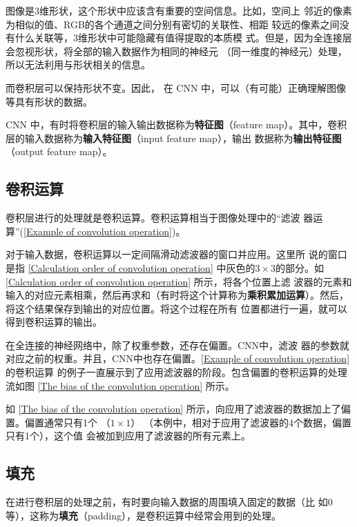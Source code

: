 \begin{tcolorbox}
    图像是3维形状，这个形状中应该含有重要的空间信息。比如，空间上
    邻近的像素为相似的值、RGB的各个通道之间分别有密切的关联性、相距
    较远的像素之间没有什么关联等，3维形状中可能隐藏有值得提取的本质模
    式。但是，因为全连接层会忽视形状，将全部的输入数据作为相同的神经元
    （同一维度的神经元）处理，所以无法利用与形状相关的信息。
\end{tcolorbox}
而卷积层可以保持形状不变。因此，
在 CNN 中，可以（有可能）正确理解图像等具有形状的数据。

CNN 中，有时将卷积层的输入输出数据称为\textbf{特征图}（feature
map）。其中，卷积层的输入数据称为\textbf{输入特征图}（input feature map），输出
数据称为\textbf{输出特征图}（output feature map）。

\subsection{卷积运算}
卷积层进行的处理就是卷积运算。卷积运算相当于图像处理中的“滤波
器运算”(\autoref{Example of convolution operation})。

对于输入数据，卷积运算以一定间隔滑动滤波器的窗口并应用。这里所
说的窗口是指 \autoref{Calculation order of convolution operation} 中灰色的$3 \times 3$的部分。如 \autoref{Calculation order of convolution operation} 所示，将各个位置上滤
波器的元素和输入的对应元素相乘，然后再求和（有时将这个计算称为\textbf{乘积累加运算}）。然后，将这个结果保存到输出的对应位置。将这个过程在所有
位置都进行一遍，就可以得到卷积运算的输出。

在全连接的神经网络中，除了权重参数，还存在偏置。CNN中，滤波
器的参数就对应之前的权重。并且，CNN中也存在偏置。\autoref{Example of convolution operation} 的卷积运算
的例子一直展示到了应用滤波器的阶段。包含偏置的卷积运算的处理流如图 \autoref{The bias of the convolution operation} 所示。


如 \autoref{The bias of the convolution operation} 所示，向应用了滤波器的数据加上了偏置。偏置通常只有1个
（$1 \times 1$）
（本例中，相对于应用了滤波器的4个数据，偏置只有1个），这个值
会被加到应用了滤波器的所有元素上。

\subsection{填充}
在进行卷积层的处理之前，有时要向输入数据的周围填入固定的数据（比
如0等），这称为\textbf{填充}（padding），是卷积运算中经常会用到的处理。

